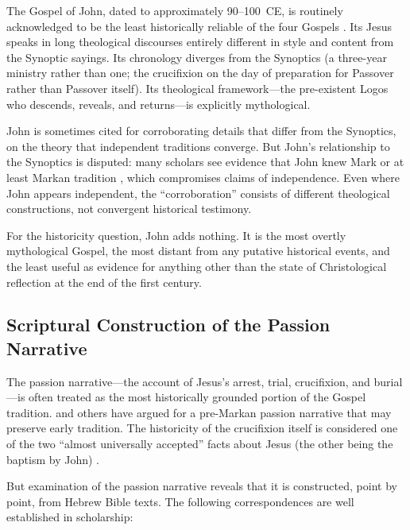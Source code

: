 \documentclass[12pt,oneside]{article}
\begin{document}
The Gospel of John, dated to approximately 90--100~CE, is routinely
acknowledged to be the least historically reliable of the four Gospels
\citep{Brown1966}.  Its Jesus speaks in long theological discourses
entirely different in style and content from the Synoptic sayings.  Its
chronology diverges from the Synoptics (a three-year ministry rather
than one; the crucifixion on the day of preparation for Passover rather
than Passover itself).  Its theological framework---the pre-existent
Logos who descends, reveals, and returns---is explicitly mythological.

John is sometimes cited for corroborating details that differ from the
Synoptics, on the theory that independent traditions converge.  But
John's relationship to the Synoptics is disputed: many scholars see
evidence that John knew Mark or at least Markan tradition
\citep{Bauckham1998}, which compromises claims of independence.  Even
where John appears independent, the ``corroboration'' consists of
different theological constructions, not convergent historical testimony.

For the historicity question, John adds nothing.  It is the most overtly
mythological Gospel, the most distant from any putative historical
events, and the least useful as evidence for anything other than the
state of Christological reflection at the end of the first century.

\subsection{Scriptural Construction of the Passion Narrative}
\label{sec:gospels:passion}

The passion narrative---the account of Jesus's arrest, trial,
crucifixion, and burial---is often treated as the most historically
grounded portion of the Gospel tradition.  \citet{Crossan1995} and
others have argued for a pre-Markan passion narrative that may preserve
early tradition.  The historicity of the crucifixion itself is
considered one of the two ``almost universally accepted'' facts about
Jesus (the other being the baptism by John) \citep{Ehrman2012}.

But examination of the passion narrative reveals that it is constructed,
point by point, from Hebrew Bible texts.  The following correspondences
are well established in scholarship:
\end{document}
